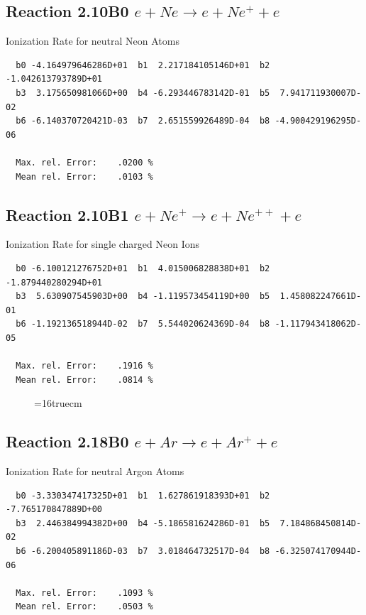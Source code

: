 \documentclass[12pt,dvipdfmx]{article}
\begin{document}
\subsection{
Reaction 2.10B0   $e + Ne \rightarrow e + Ne^+ + e  $
}
 Ionization Rate for neutral Neon Atoms

\begin{small}\begin{verbatim}
  b0 -4.164979646286D+01  b1  2.217184105146D+01  b2 -1.042613793789D+01
  b3  3.175650981066D+00  b4 -6.293446783142D-01  b5  7.941711930007D-02
  b6 -6.140370720421D-03  b7  2.651559926489D-04  b8 -4.900429196295D-06

  Max. rel. Error:    .0200 %
  Mean rel. Error:    .0103 %

\end{verbatim}\end{small}


\subsection{
Reaction 2.10B1  $ e + Ne^+ \rightarrow e + Ne^{++} + e $
}
 Ionization Rate for single charged Neon Ions

\begin{small}\begin{verbatim}
  b0 -6.100121276752D+01  b1  4.015006828838D+01  b2 -1.879440280294D+01
  b3  5.630907545903D+00  b4 -1.119573454119D+00  b5  1.458082247661D-01
  b6 -1.192136518944D-02  b7  5.544020624369D-04  b8 -1.117943418062D-05

  Max. rel. Error:    .1916 %
  Mean rel. Error:    .0814 %

\end{verbatim}\end{small}


\begin{figure} \label{2.10B0}
\epsfxsize=16truecm
\end{figure}

\newpage

\subsection{
Reaction 2.18B0   $e + Ar  \rightarrow e + Ar^+  + e$
}

  Ionization Rate for neutral Argon Atoms

\begin{small}\begin{verbatim}
  b0 -3.330347417325D+01  b1  1.627861918393D+01  b2 -7.765170847889D+00
  b3  2.446384994382D+00  b4 -5.186581624286D-01  b5  7.184868450814D-02
  b6 -6.200405891186D-03  b7  3.018464732517D-04  b8 -6.325074170944D-06

  Max. rel. Error:    .1093 %
  Mean rel. Error:    .0503 %

\end{verbatim}\end{small}
\end{document}
